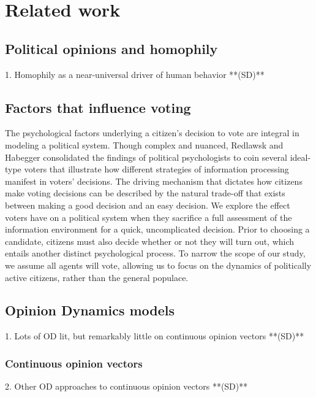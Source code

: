 \section{Related work}
\label{sec:related}

\subsection{Political opinions and homophily}
    1. Homophily as a near-universal driver of human behavior **(SD)**

\subsection{Factors that influence voting}

The psychological factors underlying a citizen’s decision to vote are integral
in modeling a political system. Though complex and nuanced, Redlawsk and
Habegger\cite{redlawsk_citizens_2020} consolidated the findings of political
psychologists to coin several ideal-type voters that illustrate how different
strategies of information processing manifest in voters’ decisions. The driving
mechanism that dictates how citizens make voting decisions can be described by
the natural trade-off that exists between making a good decision and an easy
decision. We explore the effect voters have on a political system when they
sacrifice a full assessment of the information environment for a quick,
uncomplicated decision. Prior to choosing a candidate, citizens must also
decide whether or not they will turn out, which entails another distinct
psychological process. To narrow the scope of our study, we assume all agents
will vote, allowing us to focus on the dynamics of politically active citizens,
rather than the general populace.

\subsection{Opinion Dynamics models}
    1. Lots of OD lit, but remarkably little on continuous opinion vectors **(SD)**

\subsubsection{Continuous opinion vectors}
    2. Other OD approaches to continuous opinion vectors **(SD)**

